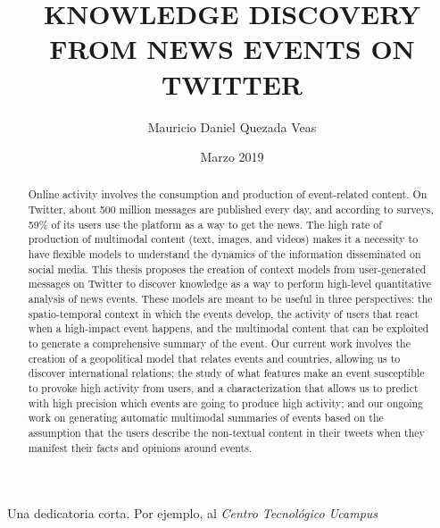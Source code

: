 \documentclass[upright, contnum]{umemoria}
\author{Mauricio Daniel Quezada Veas}
\title{KNOWLEDGE DISCOVERY FROM NEWS EVENTS ON TWITTER}
\date{Marzo 2019}
\begin{document}
\frontmatter
\maketitle 

\begin{abstract} 
    Online activity involves the consumption and production of event-related content. On Twitter, about 500 million
    messages are published every day, and according to surveys, 59\% 
    of its users use the platform as a way to get the
    news. The high rate of production of multimodal content (text, images, and videos) makes it a necessity to have flexible
    models to understand the dynamics of the information disseminated on social media. This thesis proposes the creation of
    context models from user-generated messages on Twitter to discover knowledge as a way to perform high-level quantitative
    analysis of news events. These models are meant to be useful in three perspectives: the spatio-temporal context in which
    the events develop, the activity of users that react when a high-impact event happens, and the multimodal content that can
    be exploited to generate a comprehensive summary of the event. Our current work involves the creation of a geopolitical
    model that relates events and countries, allowing us to discover international relations; the study of what features make an
    event susceptible to provoke high activity from users, and a characterization that allows us to predict with high precision
    which events are going to produce high activity; and our ongoing work on generating automatic multimodal summaries of
    events based on the assumption that the users describe the non-textual content in their tweets when they manifest their
    facts and opinions around events.
\end{abstract}

\begin{dedicatoria} %
Una dedicatoria corta. Por ejemplo, al \emph{Centro Tecnológico Ucampus}
\end{dedicatoria}

\begin{thanks} %
\lipsum[1-2]
\end{thanks}
\cleardoublepage

\tableofcontents
\listoftables %
\listoffigures %

\mainmatter








 




\end{document}
